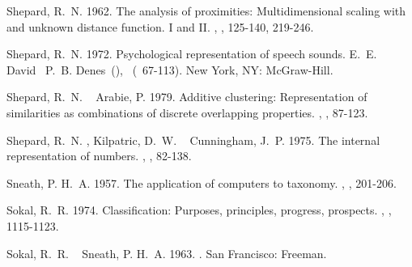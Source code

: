 \documentclass[11pt]{article}
\begin{document}
\begin{thebibliography}{}
%
%
Shepard, R.~N.%
%
\newblock{}\BBOP{}1962\BBCP{}.
\newblock{}\BBOQ{}The analysis of proximities: Multidimensional scaling with
  and unknown distance function. {I} and {II}.\BBCQ{}
\newblock{}, , 125-140, 219-246.

%
%
Shepard, R.~N.%
%
\newblock{}\BBOP{}1972\BBCP{}.
\newblock{}\BBOQ{}Psychological representation of speech sounds.\BBCQ{}
\newblock{}\BIn{} E.~E. David\ \BBA{} P.~B. Denes\ (\BEDS), \ (\BPG\ 67-113).
\newblock{}New York, NY: McGraw-Hill.

%
%
Shepard, R.~N.%
\BCBT{}\ \BBA{} Arabie, P.%
%
\newblock{}\BBOP{}1979\BBCP{}.
\newblock{}\BBOQ{}Additive clustering: Representation of similarities as
  combinations of discrete overlapping properties.\BBCQ{}
\newblock{}, , 87-123.

%
%
Shepard, R.~N.%
, Kilpatric, D.~W.%
\BCBL{}\ \BBA{} Cunningham, J.~P.%
%
\newblock{}\BBOP{}1975\BBCP{}.
\newblock{}\BBOQ{}The internal representation of numbers.\BBCQ{}
\newblock{}, , 82-138.

%
%
Sneath, P. H.~A.%
%
\newblock{}\BBOP{}1957\BBCP{}.
\newblock{}\BBOQ{}The application of computers to taxonomy.\BBCQ{}
\newblock{}, , 201-206.

%
%
Sokal, R.~R.%
%
\newblock{}\BBOP{}1974\BBCP{}.
\newblock{}\BBOQ{}Classification: Purposes, principles, progress,
  prospects.\BBCQ{}
\newblock{}, , 1115-1123.

%
%
Sokal, R.~R.%
\BCBT{}\ \BBA{} Sneath, P. H.~A.%
%
\newblock{}\BBOP{}1963\BBCP{}.
\newblock{}.
\newblock{}San Francisco: Freeman.


\end{thebibliography}
\end{document}
